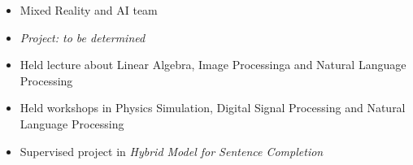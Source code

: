 \documentclass[10pt,a4paper]{source/altacv}
\begin{document}
\tagline{}

%

\begin{fullwidth}
\makecvheader 
\end{fullwidth}

%




\begin{itemize}
    \item   \small{Mixed Reality and AI team}
    \item   \small{\textit{Project: to be determined}}
\end{itemize}

\divider



\begin{itemize}
    \item   \small{Held lecture about Linear Algebra, Image Processinga and Natural Language Processing}
    \item   \small{Held workshops in Physics Simulation, Digital Signal Processing and Natural Language Processing}
    \item   \small{Supervised project in \textit{Hybrid Model for Sentence Completion}}
\end{itemize}


\end{document}
